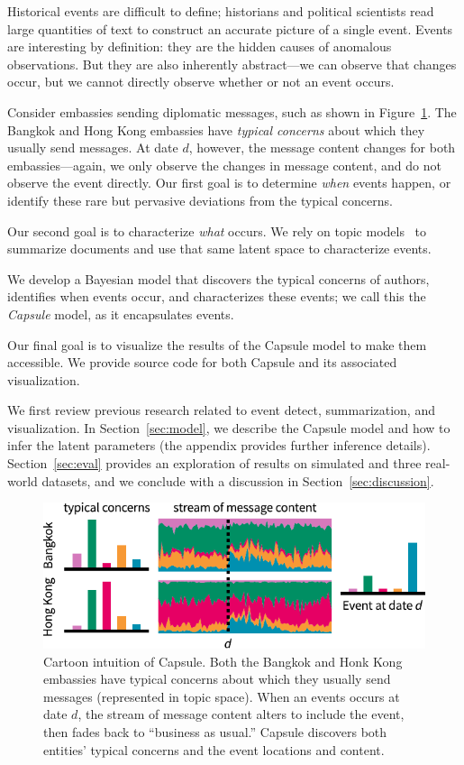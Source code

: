 
Historical events are difficult to define; historians and political scientists read large quantities of text to construct an accurate picture of a single event.  Events are interesting by definition: they are the hidden causes of anomalous observations.  But they are also inherently abstract---we can observe that changes occur, but we cannot directly observe whether or not an event occurs.

Consider embassies sending diplomatic messages, such as shown in Figure~\ref{fig:cartoon}.  The Bangkok and Hong Kong embassies have \emph{typical concerns} about which they usually send messages.  At date $d$, however, the message content changes for both embassies---again, we only observe the changes in message content, and do not observe the event directly.  Our first goal is to determine \emph{when} events happen, or identify these rare but pervasive deviations from the typical concerns.

Our second goal is to characterize \emph{what} occurs.  We rely on topic models~\cite{Blei:2012} to summarize documents and use that same latent space to characterize events.

We develop a Bayesian model that discovers the typical concerns of authors, identifies when events occur, and characterizes these events; we call this the \emph{Capsule} model, as it encapsulates events.

Our final goal is to visualize the results of the Capsule model to make them accessible.   We provide source code for both Capsule and its associated visualization.

We first review previous research related to event detect, summarization, and visualization.  In Section~\ref{sec:model}, we describe the Capsule model and how to infer the latent parameters (the appendix provides further inference details).  Section~\ref{sec:eval} provides an exploration of results on simulated and three real-world datasets, and we conclude with a discussion in Section~\ref{sec:discussion}.


\begin{figure}
\centering
\includegraphics[width=\linewidth]{fig/cartoon.pdf}
\caption{Cartoon intuition of Capsule.  Both the Bangkok and Honk Kong embassies have typical concerns about which they usually send messages (represented in topic space).  When an events occurs at date $d$, the stream of message content alters to include the event, then fades back to ``business as usual.''  Capsule discovers both entities' typical concerns and the event locations and content.}
\label{fig:cartoon}
\end{figure}

